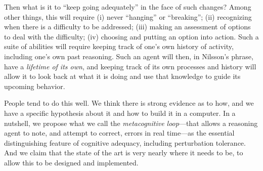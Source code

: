 \documentclass[12pt]{article}
\begin{document}
Then what is it to ``keep going adequately'' in the face of such
changes?  Among other things, this will require (i) never ``hanging''
or ``breaking''; (ii) recognizing when there is a difficulty to be
addressed; (iii) making an assessment of options to deal with the
difficulty; (iv) choosing and putting an option into action.  Such a
suite of abilities will require keeping track of one's own history of
activity, including one's own past reasoning.  Such an agent will then,
in Nilsson's phrase, have a {\em lifetime of its own}, and keeping
track of its own processes and history will allow it to look back at
what it is doing and use that knowledge to guide its upcoming
behavior.

People tend to do this well.
We think there is strong evidence as to how, and we have a specific
hypothesis about it and how to build it in a computer.  In a nutshell,
we propose what we call the {\em metacognitive loop}---that allows a
reasoning agent to note, and attempt to correct, errors in real
time---as the essential distinguishing feature of cognitive adequacy,
including perturbation tolerance. And we claim that the state of the
art is very nearly where it needs to be, to allow this to be designed
and implemented.
\end{document}
